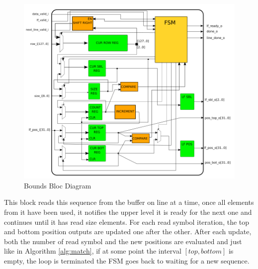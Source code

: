 \begin{figure}[H]
    \centering
   \includegraphics[scale = 0.4]{Figures/BOUNDS_DIAG.png}
    \caption{Bounds Bloc Diagram}
    \label{fig:bounds_diag}
\end{figure}



 This block reads this sequence from the buffer on line at a time, once all elements from it have been used, it notifies the upper level it is ready for the next one and continues until it has read \textrm{size} elements. For each read symbol iteration, the top and bottom position outputs are updated one after the other. After each update, both the number of read symbol and the new positions are evaluated and just like in Algorithm \ref{alg:match}, if at some point the interval $ [ top,bottom ] $ is empty, the loop is terminated the FSM goes back to waiting for a new sequence.

